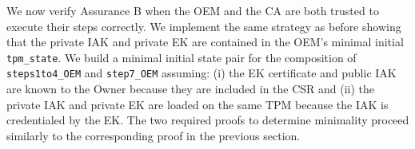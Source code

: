 \documentclass[runningheads]{llncs}
\begin{document}


We now verify Assurance B when the OEM and the CA are both trusted to
execute their steps correctly. We implement the same strategy as
before showing that the private IAK and private EK are contained in
the OEM's minimal initial \verb|tpm_state|. We build a minimal initial
state pair for the composition of \verb|steps1to4_OEM| and
\verb|step7_OEM| assuming: (i) the EK certificate and public IAK are
known to the Owner because they are included in the CSR and (ii) the
private IAK and private EK are loaded on the same TPM because the IAK
is credentialed by the EK. The two required proofs to determine
minimality proceed similarly to the corresponding proof in the
previous section.
\end{document}
